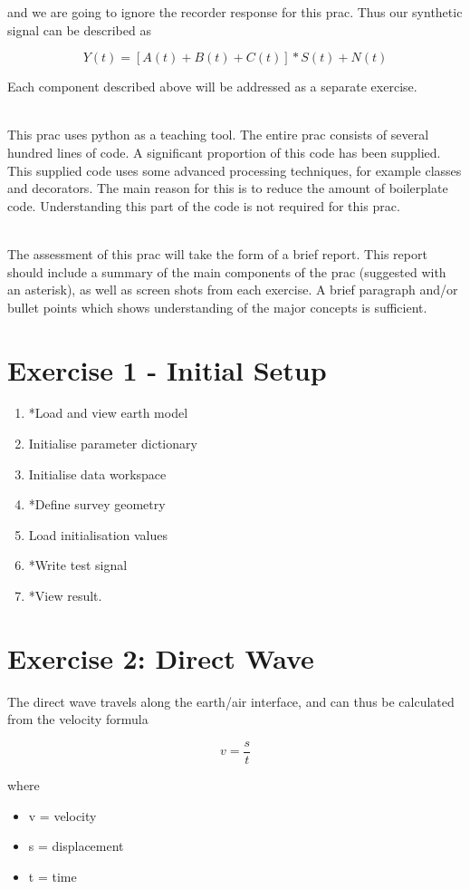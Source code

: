 \documentclass[a4paper, 10pt]{article}
\begin{document}
and we are going to ignore the recorder response for this prac.  Thus our synthetic signal can be described as 

\[ Y(t) = \left[ A(t) + B(t) + C(t) \right] * S(t) + N(t) \]

Each component described above will be addressed as a separate exercise.
\par~\\
This prac uses python as a teaching tool.  The entire prac consists of several hundred lines of code. A significant proportion of this code has been supplied.  This supplied code uses some advanced processing techniques, for example classes and decorators.  The main reason for this is to reduce the amount of boilerplate code.  Understanding this part of the code  is not required for this prac.  
\par~\\
The assessment of this prac will take the form of a brief report.  This report should include a summary of the main components of the prac (suggested with an asterisk), as well as screen shots from each exercise.  A brief paragraph and/or bullet points which shows understanding of the major concepts is sufficient.  

\section*{Exercise 1 - Initial Setup}
\begin{enumerate}
\item *Load and view earth model
\item Initialise parameter dictionary
\item Initialise data workspace
\item *Define survey geometry
\item Load initialisation values
\item *Write test signal
\item *View result.
\end{enumerate}


\section*{Exercise 2: Direct Wave}
The direct wave travels along the earth/air interface, and can thus be calculated from the velocity formula

\[ v = \frac{s}{t} \]

where 
\begin{itemize}
\item v = velocity
\item s = displacement
\item t = time
\end{itemize}
\end{document}
